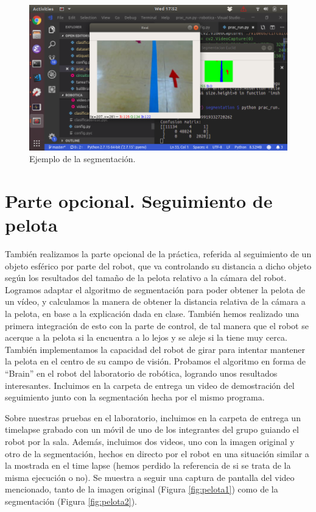 \documentclass{article}
\begin{document}
	\begin{figure}[H]
	    \centering
	    \includegraphics[width=12cm]{figura4.png}
	    \caption{Ejemplo de la segmentación.}
	    \label{fig:figura4}
	\end{figure}



\section{Parte opcional. Seguimiento de pelota}
	También realizamos la parte opcional de la práctica, referida al seguimiento de un objeto esférico por parte del robot, que va controlando su distancia a dicho objeto según los resultados del tamaño de la pelota relativo a la cámara del robot. Logramos adaptar el algoritmo de segmentación para poder obtener la pelota de un vídeo, y calculamos la manera de obtener la distancia relativa de la cámara a la pelota, en base a la explicación dada en clase. También hemos realizado una primera integración de esto con la parte de control, de tal manera que el robot se acerque a la pelota si la encuentra a lo lejos y se aleje si la tiene muy cerca. También implementamos la capacidad del robot de girar para intentar mantener la pelota en el centro de su campo de visión. Probamos el algoritmo en forma de “Brain” en el robot del laboratorio de robótica, logrando unos resultados interesantes. Incluimos en la carpeta de entrega un video de demostración del seguimiento junto con la segmentación hecha por el mismo programa.

	Sobre nuestras pruebas en el laboratorio, incluimos en la carpeta de entrega un timelapse grabado con un móvil de uno de los integrantes del grupo guiando el robot por la sala. Además, incluimos dos videos, uno con la imagen original y otro de la segmentación, hechos en directo por el robot en una situación similar a la mostrada en el time lapse (hemos perdido la referencia de si se trata de la misma ejecución o no). Se muestra a seguir una captura de pantalla del video mencionado, tanto de la imagen original (Figura \ref{fig:pelota1}) como de la segmentación (Figura \ref{fig:pelota2}).
\end{document}
